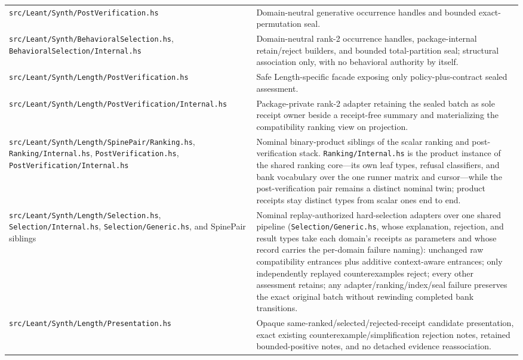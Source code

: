 \documentclass[10pt,letterpaper,oneside]{report}
\newcommand{\code}[1]{\texttt{\detokenize{#1}}}
\newcommand{\filepath}[1]{\nolinkurl{#1}}
\begin{document}
\begin{longtable}{@{}L{0.43\textwidth}L{0.53\textwidth}@{}}
\filepath{src/Leant/Synth/PostVerification.hs} & Domain-neutral generative occurrence handles and bounded exact-permutation seal. \\
\filepath{src/Leant/Synth/BehavioralSelection.hs}, \filepath{BehavioralSelection/Internal.hs} & Domain-neutral rank-2 occurrence handles, package-internal retain/reject builders, and bounded total-partition seal; structural association only, with no behavioral authority by itself. \\
\filepath{src/Leant/Synth/Length/PostVerification.hs} & Safe Length-specific facade exposing only policy-plus-contract sealed assessment. \\
\filepath{src/Leant/Synth/Length/PostVerification/Internal.hs} & Package-private rank-2 adapter retaining the sealed batch as sole receipt owner beside a receipt-free summary and materializing the compatibility ranking view on projection. \\
\filepath{src/Leant/Synth/Length/SpinePair/Ranking.hs}, \filepath{Ranking/Internal.hs}, \filepath{PostVerification.hs}, \filepath{PostVerification/Internal.hs} & Nominal binary-product siblings of the scalar ranking and post-verification stack. \filepath{Ranking/Internal.hs} is the product instance of the shared ranking core---its own leaf types, refusal classifiers, and bank vocabulary over the one runner matrix and cursor---while the post-verification pair remains a distinct nominal twin; product receipts stay distinct types from scalar ones end to end. \\
\filepath{src/Leant/Synth/Length/Selection.hs}, \filepath{Selection/Internal.hs}, \filepath{Selection/Generic.hs}, and SpinePair siblings & Nominal replay-authorized hard-selection adapters over one shared pipeline (\filepath{Selection/Generic.hs}, whose explanation, rejection, and result types take each domain's receipts as parameters and whose \code{SelectionDomain} record carries the per-domain failure naming): unchanged raw compatibility entrances plus additive context-aware entrances; only independently replayed counterexamples reject; every other assessment retains; any adapter/ranking/index/seal failure preserves the exact original batch without rewinding completed bank transitions. \\
\filepath{src/Leant/Synth/Length/Presentation.hs} & Opaque same-ranked/selected/rejected-receipt candidate presentation, exact existing counterexample/simplification rejection notes, retained bounded-positive notes, and no detached evidence reassociation. \\

\end{longtable}
\end{document}
